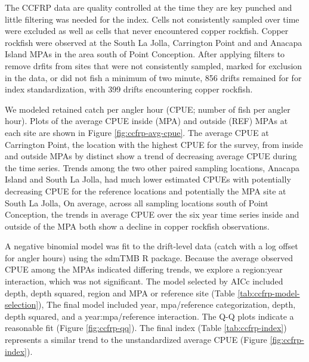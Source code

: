 \documentclass[11pt,
  english,
  letterpaper,
]{article}
\begin{document}
The CCFRP data are quality controlled at the time they are key punched and little filtering was needed for the index. Cells not consistently sampled over time were excluded as well as cells that never encountered copper rockfish. Copper rockfish were observed at the South La Jolla, Carrington Point and and Anacapa Island MPAs in the area south of Point Conception. After applying filters to remove drfits from sites that were not consistently sampled, marked for exclusion in the data, or did not fish a minimum of two minute, 856 drifts remained for for index standardization, with 399 drifts encountering copper rockfish.

We modeled retained catch per angler hour (CPUE; number of fish per angler hour). Plots of the average CPUE inside (MPA) and outside (REF) MPAs at each site are shown in Figure \ref{fig:ccfrp-avg-cpue}. The average CPUE at Carrington Point, the location with the highest CPUE for the survey, from inside and outside MPAs by distinct show a trend of decreasing average CPUE during the time series. Trends among the two other paired sampling locations, Anacapa Island and South La Jolla, had much lower estimated CPUEs with potentially decreasing CPUE for the reference locations and potentially the MPA site at South La Jolla, On average, across all sampling locations south of Point Conception, the trends in average CPUE over the six year time series inside and outside of the MPA both show a decline in copper rockfish observations.

A negative binomial model was fit to the drift-level data (catch with a log offset for angler hours) using the sdmTMB R package. Because the average observed CPUE among the MPAs indicated differing trends, we explore a region:year interaction, which was not significant. The model selected by AICc included depth, depth squared, region and MPA or reference site (Table \ref{tab:ccfrp-model-selection}), The final model included year, mpa/reference categorization, depth, depth squared, and a year:mpa/reference interaction. The Q-Q plots indicate a reasonable fit (Figure \ref{fig:ccfrp-qq}). The final index (Table \ref{tab:ccfrp-index}) represents a similar trend to the unstandardized average CPUE (Figure \ref{fig:ccfrp-index}).
\end{document}
